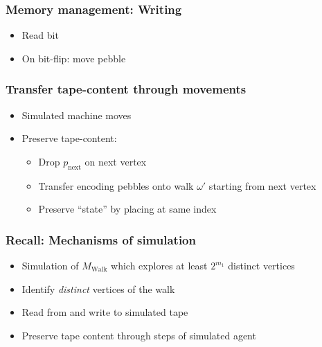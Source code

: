 \documentclass{beamer}
\begin{document}
\begin{frame}
  \frametitle{Memory management: Writing}
  \begin{itemize}
    \item Read bit
    \item On bit-flip: move pebble
  \end{itemize}
  \resizebox{\textwidth}{!}{}
\end{frame}

\begin{frame}
  \frametitle{Transfer tape-content through movements}
  \begin{itemize}
    \item Simulated machine moves
    \item Preserve tape-content:
      \begin{itemize}
        \item Drop $p_{\text{next}}$ on next vertex
        \item Transfer encoding pebbles onto walk $\omega'$ starting from
          next vertex
        \item Preserve \enquote{state} by placing at same index
      \end{itemize}
  \end{itemize}
\end{frame}

\begin{frame}
  \frametitle{Recall: Mechanisms of simulation}
  \begin{itemize}
    \item Simulation of $M_{\text{Walk}}$ which explores at least $2^{m_{1}}$
      distinct vertices 
    \item Identify \emph{distinct} vertices of the walk
    \item Read from and write to simulated tape 
    \item Preserve tape content through steps of simulated agent
  \end{itemize}
\end{frame}
\end{document}
